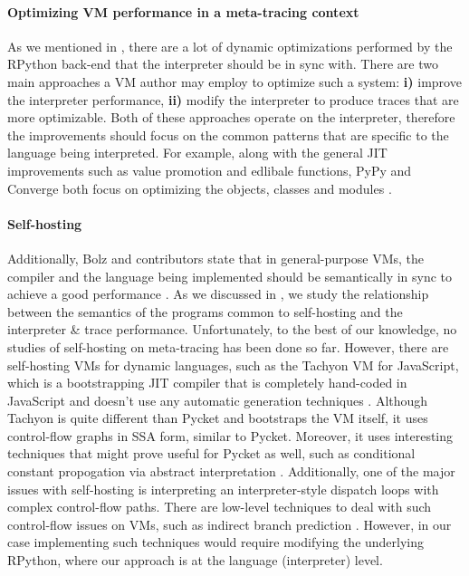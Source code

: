 \paragraph{Optimizing VM performance in a meta-tracing context}
As we mentioned in , there are a lot of dynamic
optimizations performed by the RPython back-end that the interpreter
should be in sync with. There are two main approaches a VM author may
employ to optimize such a system: \textbf{i)} improve the interpreter
performance, \textbf{ii)} modify the interpreter to produce traces
that are more optimizable. Both of these approaches operate on the
interpreter, therefore the improvements should focus on the common
patterns that are specific to the language being interpreted. For
example, along with the general JIT improvements such as value
promotion and edlibale functions, PyPy and Converge both focus on
optimizing the objects, classes and modules \cite{bolz15-meta-vm}.

\paragraph{Self-hosting}
Additionally, Bolz and contributors state that in general-purpose VMs,
the compiler and the language being implemented should be semantically
in sync to achieve a good performance \cite{bolz_how_no:07,
  runtime-feedback:11}. As we discussed in
, we study the relationship between the
semantics of the programs common to self-hosting and the interpreter
\& trace performance. Unfortunately, to the best of our knowledge, no
studies of self-hosting on meta-tracing has been done so far. However,
there are self-hosting VMs for dynamic languages, such as the Tachyon
VM for JavaScript, which is a bootstrapping JIT compiler that is
completely hand-coded in JavaScript and doesn't use any automatic
generation techniques \cite{self-hostJSvm:11}. Although Tachyon is
quite different than Pycket and bootstraps the VM itself, it uses
control-flow graphs in SSA form, similar to Pycket. Moreover, it uses
interesting techniques that might prove useful for Pycket as well,
such as conditional constant propogation via abstract interpretation
\cite{sccp:91}. Additionally, one of the major issues with
self-hosting is interpreting an interpreter-style dispatch loops with
complex control-flow paths. There are low-level techniques to deal
with such control-flow issues on VMs, such as indirect branch
prediction \cite{branch-predict:03}. However, in our case implementing
such techniques would require modifying the underlying RPython, where
our approach is at the language (interpreter) level.



